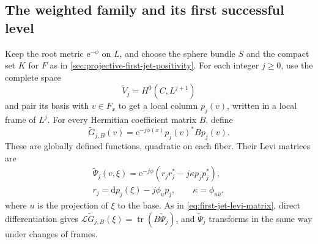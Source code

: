\subsection{The weighted family and its first successful level}

Keep the root metric $\mathrm e^{-\phi}$ on $L$, and choose the sphere bundle $S$ and the compact set $K$ for $F$ as in \cref{sec:projective-first-jet-positivity}. For each integer $j\geq0$, use the complete space
\[
 \widetilde V_j=H^0(C,L^{j+1})
\]
and pair its basis with $v\in F_x$ to get a local column $p_j(v)$, written in a local frame of $L^j$. For every Hermitian coefficient matrix $B$, define
\[
 \widetilde G_{j,B}(v)=\mathrm e^{-j\phi(x)}p_j(v)^*B p_j(v).
\]
These are globally defined functions, quadratic on each fiber. Their Levi matrices are
\[
 \begin{gathered}
 \widetilde\Psi_j(v,\xi)=\mathrm e^{-j\phi}
       (r_jr_j^*-j\kappa p_jp_j^*),\\
 r_j=\mathrm dp_j(\xi)-j\phi_u p_j,\qquad
 \kappa=\phi_{u\bar u},
 \end{gathered}
\]
where $u$ is the projection of $\xi$ to the base. As in \eqref{eq:first-jet-levi-matrix}, direct differentiation gives $\mathcal L\widetilde G_{j,B}(\xi)=\operatorname{tr}(B\widetilde\Psi_j)$, and $\widetilde\Psi_j$ transforms in the same way under changes of frames.

